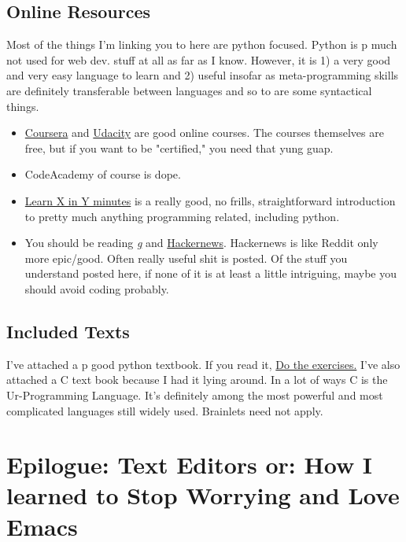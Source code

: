 \documentclass[11pt]{article}
\begin{document}
\subsection{Online Resources}
\label{sec:org3657df6}

Most of the things I'm linking you to here are python focused. Python is p much not used for web dev. stuff at all as far as I know. However, it is 1) a very good and very easy language to learn and 2) useful insofar as meta-programming skills are definitely transferable between languages and so to are some syntactical things. 
\begin{itemize}
\item \href{https://www.coursera.org/specializations/python}{Coursera} and \href{https://www.udacity.com/course/programming-foundations-with-python--ud036}{Udacity} are good online courses. The courses themselves are free, but if you want to be "certified," you need that yung guap.
\item CodeAcademy of course is dope.
\item \href{https://learnxinyminutes.com/}{Learn X in Y minutes} is a really good, no frills, straightforward introduction to pretty much anything programming related, including python.
\item You should be reading \href{http://boards.4chan.org/g/}{\emph{g}} and \href{https://news.ycombinator.com/}{Hackernews}. Hackernews is like Reddit only more epic/good. Often really useful shit is posted. Of the stuff you understand posted here, if none of it is at least a little intriguing, maybe you should avoid coding probably.
\end{itemize}

\subsection{Included Texts}
\label{sec:orgf86181c}

I've attached a p good python textbook. If you read it, \uline{Do the exercises.}
I've also attached a C text book because I had it lying around. In a lot of ways C is the Ur-Programming Language. It's definitely among the most powerful and most complicated languages still widely used. Brainlets need not apply.

\section{Epilogue: Text Editors or: How I learned to Stop Worrying and Love Emacs}
\label{sec:org5bf5922}
\end{document}
